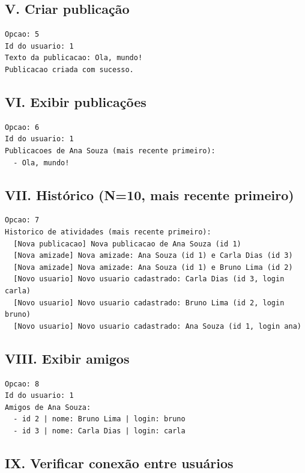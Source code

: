 \documentclass[
	12pt,				%
	oneside,			%
	a4paper,			%
	chapter=TITLE,		%
	brazil,				%
	]{abntex2}
\begin{document}
\subsection{V. Criar publicação}

\begin{lstlisting}
Opcao: 5
Id do usuario: 1
Texto da publicacao: Ola, mundo!
Publicacao criada com sucesso.
\end{lstlisting}

\subsection{VI. Exibir publicações}

\begin{lstlisting}
Opcao: 6
Id do usuario: 1
Publicacoes de Ana Souza (mais recente primeiro):
  - Ola, mundo!
\end{lstlisting}

\subsection{VII. Histórico (N=10, mais recente primeiro)}

\begin{lstlisting}
Opcao: 7
Historico de atividades (mais recente primeiro):
  [Nova publicacao] Nova publicacao de Ana Souza (id 1)
  [Nova amizade] Nova amizade: Ana Souza (id 1) e Carla Dias (id 3)
  [Nova amizade] Nova amizade: Ana Souza (id 1) e Bruno Lima (id 2)
  [Novo usuario] Novo usuario cadastrado: Carla Dias (id 3, login carla)
  [Novo usuario] Novo usuario cadastrado: Bruno Lima (id 2, login bruno)
  [Novo usuario] Novo usuario cadastrado: Ana Souza (id 1, login ana)
\end{lstlisting}

\subsection{VIII. Exibir amigos}

\begin{lstlisting}
Opcao: 8
Id do usuario: 1
Amigos de Ana Souza:
  - id 2 | nome: Bruno Lima | login: bruno
  - id 3 | nome: Carla Dias | login: carla
\end{lstlisting}

\subsection{IX. Verificar conexão entre usuários}
\end{document}

